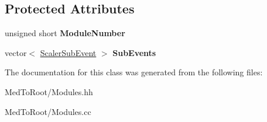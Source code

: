 \subsection*{Protected Attributes}
\begin{DoxyCompactItemize}
\item 
\hypertarget{class_s_i_s_scaler_a4265cde97345c344d921d5eb1be0df50}{unsigned short {\bfseries Module\-Number}}\label{class_s_i_s_scaler_a4265cde97345c344d921d5eb1be0df50}

\item 
\hypertarget{class_s_i_s_scaler_a671eb8d858f9d2d4550fe76a89cf3095}{vector$<$ \hyperlink{class_scaler_sub_event}{Scaler\-Sub\-Event} $>$ {\bfseries Sub\-Events}}\label{class_s_i_s_scaler_a671eb8d858f9d2d4550fe76a89cf3095}

\end{DoxyCompactItemize}


The documentation for this class was generated from the following files\-:\begin{DoxyCompactItemize}
\item 
Med\-To\-Root/Modules.\-hh\item 
Med\-To\-Root/Modules.\-cc\end{DoxyCompactItemize}
